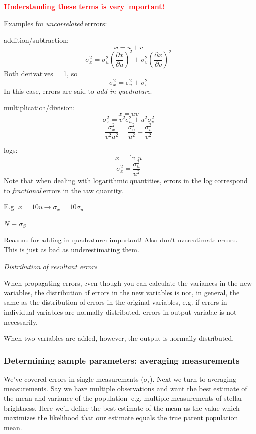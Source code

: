 \documentclass[12pt]{article}
\begin{document}
\textcolor{red}{\textbf{Understanding these terms is very important!}}

Examples for \emph{uncorrelated} errrors:
\begin{itemize*}
    \item addition/subtraction:
        $$ x = u + v $$
        $$ \sigma_x^2 = \sigma_u^2\left(\frac{\partial x}
        {\partial u}\right)^2
        + \sigma_v^2\left(\frac{\partial x}{\partial v}\right)^2 $$
        Both derivatives = 1, so
        $$ \sigma_x^2 = \sigma_u^2 + \sigma_v^2 $$
        In this case, errors are said to \emph{add in quadrature}.
    \item multiplication/division:
        $$ x = uv $$
        $$ \sigma_x^2 = v^2\sigma_u^2 + u^2\sigma_v^2 $$
        $$ \frac{\sigma_x^2}{v^2u^2} =
        \frac{\sigma_u^2}{u^2} + \frac{\sigma_v^2}{v^2}$$
    \item logs:
        $$ x = \ln u $$
        $$ \sigma_x^2 = \frac{\sigma_u^2}{u^2} $$
        Note that when dealing with logarithmic quantities, errors in
        the log correspond to \emph{fractional} errors in the raw
        quantity.
\end{itemize*}

\textcolor{myBlue}{E.g. $x=10u \rightarrow \sigma_x=10\sigma_u$}

\textcolor{myBlue}{$N \equiv \sigma_S$}

\textcolor{myBlue}{Reasons for adding in quadrature: important!
Also don't overestimate errors. This is just as bad as
underestimating them.}

\emph{Distribution of resultant errors}

When propagating errors, even though you can calculate the variances
in the new variables, the distribution of errors in the new variables
is not, in general, the same as the distribution of errors in the
original variables, e.g. if errors in individual variables are
normally distributed, errors in output variable is not necessarily.

When two variables are added, however, the output is normally
distributed.


\textcolor{om}{\emph{}}


\subsubsection*{Determining sample parameters: averaging measurements}
We've covered errors in single measurements ($\sigma_i$).
Next we turn to averaging measurements.
Say we have multiple observations and want the best
estimate of the mean and variance of the population, e.g. multiple
measurements of stellar brightness. Here we'll define the best
estimate of the mean as the value which maximizes the likelihood that
our estimate equals the true parent population mean.
\end{document}
